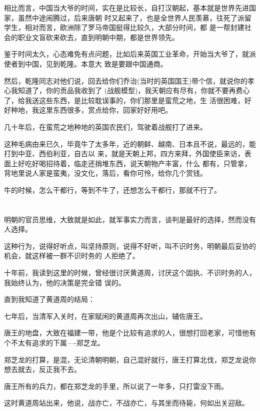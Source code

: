 \documentclass[11pt,a4paper,onecolumn]{article}
\begin{document}
相比而言，中国当大爷的时间，实在是比较长，自打汉朝起，基本就是世界先进国家，虽然中途闹腾过，后来唐朝
时又起来了，也是全世界人民羡慕，往死了派留学生，相对而言，欧洲除了罗马帝国挺得比较久，大部分时间，都
是一帮封建社会的职业文盲砍来砍去，直到明朝中期，都是世界领先。

鉴于时间太久，心态难免有点问题，比如后来英国工业革命，开始当大爷了，就派使者到中国，见到乾隆。本意大
致是要跟中国通商。

然后，乾隆同志对他们说，回去给你们乔治(当时的英国国王)带个信，就说你的孝心我知道了，你的贡品我收到了
(战舰模型)，我天朝应有尽有，你就不要再费心了，给我送这些东西，是比较耽误事的，你们那里是蛮荒之地，生
活很困难，好好种地，我这里东西很多，赏点给你，回家好好用吧。

几十年后，在蛮荒之地种地的英国农民们，驾驶着战舰打了进来。

这种毛病由来已久，毕竟牛了太多年，近的朝鲜、越南、日本且不说，最远的，能打到中亚、西伯利亚，自古以
来，就是天朝上邦，四方来拜，外国使臣来访，表面上好吃好喝招待着，临走还捎堆东西，说天朝物产丰富，什么
都有，只管拿，背地里说人家是蛮夷，没文化，落后，看你可怜，给你几个赏钱。

牛的时候，怎么干都行，等到不牛了，还想怎么干都行，那就不行了。

\section[\thesection]{}

明朝的官员思维，大致就是如此，就军事实力而言，谈判是最好的选择，然而没有人选择。

这种行为，说得好听点，叫坚持原则，说得不好听，叫不识时务，明朝最后妥协的机会，就这样被一群不识时务的
人拒绝了。

十年前，我读到这里的时候，曾经很讨厌黄道周，讨厌这个固执、不识时务的人，我始终认为，他的决策是完全错
误的。

直到我知道了黄道周的结局：

七年后，当清军入关时，在家赋闲的黄道周再次出山，辅佐唐王。

唐王的地盘，大致在福建一带，他是个比较有追求的人，很想打回老家，可惜他有个不太有追求的下属----郑芝龙。

郑芝龙的打算，是混，无论清朝明朝，自己混好就行，唐王打算北伐，郑芝龙说你想去就去，反正我不去。

唐王所有的兵力，都在郑芝龙的手里，所以说了一年多，只打雷没下雨。

这时黄道周站出来，他说，战亦亡，不战亦亡，与其坐而待毙，何如出关迎敌。
\end{document}
